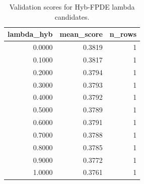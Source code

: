 \begin{table}[t]
\caption{Validation scores for Hyb-FPDE lambda candidates.}
\label{tab:lambda_distribution_computed}
\centering
\begin{tabular}{rrr}
\toprule
lambda\_hyb & mean\_score & n\_rows \\
\midrule
0.0000 & 0.3819 & 1 \\
0.1000 & 0.3817 & 1 \\
0.2000 & 0.3794 & 1 \\
0.3000 & 0.3793 & 1 \\
0.4000 & 0.3792 & 1 \\
0.5000 & 0.3789 & 1 \\
0.6000 & 0.3791 & 1 \\
0.7000 & 0.3788 & 1 \\
0.8000 & 0.3785 & 1 \\
0.9000 & 0.3772 & 1 \\
1.0000 & 0.3761 & 1 \\
\bottomrule
\end{tabular}

\end{table}
